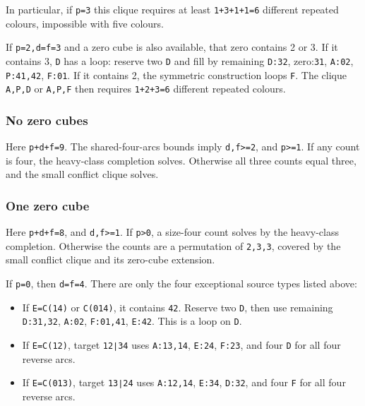 \documentclass[
  10pt,
]{article}
\providecommand{\tightlist}{%
  \setlength{\itemsep}{0pt}\setlength{\parskip}{0pt}}
\begin{document}
In particular, if \texttt{p=3} this clique requires at least
\texttt{1+3+1+1=6} different repeated colours, impossible with five
colours.

If \texttt{p=2,d=f=3} and a zero cube is also available, that zero
contains 2 or 3. If it contains 3, \texttt{D} has a loop: reserve two
\texttt{D} and fill by remaining \texttt{D:32}, zero:\texttt{31},
\texttt{A:02}, \texttt{P:41,42}, \texttt{F:01}. If it contains 2, the
symmetric construction loops \texttt{F}. The clique \texttt{A,P,D} or
\texttt{A,P,F} then requires \texttt{1+2+3=6} different repeated
colours.

\hypertarget{no-zero-cubes}{%
\subsubsection*{No zero cubes}\label{no-zero-cubes}}

Here \texttt{p+d+f=9}. The shared-four-arcs bounds imply
\texttt{d,f\textgreater{}=2}, and \texttt{p\textgreater{}=1}. If any
count is four, the heavy-class completion solves. Otherwise all three
counts equal three, and the small conflict clique solves.

\hypertarget{one-zero-cube}{%
\subsubsection*{One zero cube}\label{one-zero-cube}}

Here \texttt{p+d+f=8}, and \texttt{d,f\textgreater{}=1}. If
\texttt{p\textgreater{}0}, a size-four count solves by the heavy-class
completion. Otherwise the counts are a permutation of \texttt{2,3,3},
covered by the small conflict clique and its zero-cube extension.

If \texttt{p=0}, then \texttt{d=f=4}. There are only the four
exceptional source types listed above:

\begin{itemize}
\tightlist
\item
  If \texttt{E=C(14)} or \texttt{C(014)}, it contains \texttt{42}.
  Reserve two \texttt{D}, then use remaining \texttt{D:31,32},
  \texttt{A:02}, \texttt{F:01,41}, \texttt{E:42}. This is a loop on
  \texttt{D}.
\item
  If \texttt{E=C(12)}, target \texttt{12∣34} uses \texttt{A:13,14},
  \texttt{E:24}, \texttt{F:23}, and four \texttt{D} for all four reverse
  arcs.
\item
  If \texttt{E=C(013)}, target \texttt{13∣24} uses \texttt{A:12,14},
  \texttt{E:34}, \texttt{D:32}, and four \texttt{F} for all four reverse
  arcs.
\end{itemize}
\end{document}
